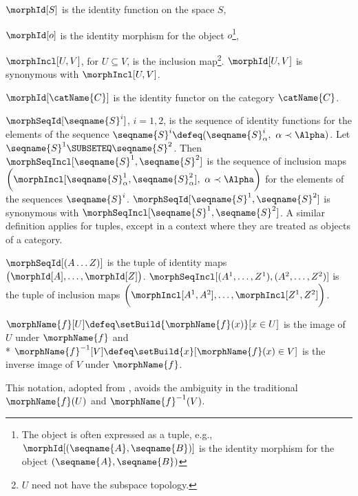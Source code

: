 \documentclass{article}
\begin{document}
\begin{definition}[Identity]
\label{def:Id}
$\morphId[S]$ is the identity function on the space $S$,

$\morphId[o]$ is the
identity morphism for the object $o$\footnote{
The object is often expressed as a tuple, e.g.,
$\morphId[{{(\seqname{A}, \seqname{B})}}]$ is the identity morphism for the
object $(\seqname{A}, \seqname{B})$
},

$\morphIncl[U,V]$, for $U \subseteq V$, is the inclusion map\footnote{
$U$ need not have the subspace topology.
}.
$\morphId[{{U,V}}]$ is synonymous with $\morphIncl[U,V]$.

$\morphId[\catName{C}]$ is the identity functor on the category $\catName{C}$.

$\morphSeqId[\seqname{S}^i]$, $i=1,2$, is the sequence of identity functions
for the elements of the sequence
$\seqname{S}^i \defeq (\seqname{S}^i_\alpha,~ \alpha \prec \Alpha)$. Let
$\seqname{S}^1 \SUBSETEQ \seqname{S}^2$. Then
$\morphSeqIncl[\seqname{S}^1,\seqname{S}^2]$ is the sequence of inclusion maps
$
  \biggl (
    \morphIncl[\seqname{S}^1_\alpha,\seqname{S}^2_\alpha],~ \alpha \prec \Alpha
  \biggr )
$
for the elements of the sequences $\seqname{S}^i$.
$\morphSeqId[{{\seqname{S}^1,\seqname{S}^2}}]$ is synonymous with
$\morphSeqIncl[\seqname{S}^1,\seqname{S}^2]$.  A similar definition applies for
tuples, except in a context where they are treated as objects of a
category.

$\morphSeqId[{{(A \dots Z)}}]$ is the tuple of identity maps
$\bigl (\morphId[A], \dots, \morphId[Z] \bigr)$.
$\morphSeqIncl[{(A^1, \dots, Z^1)},{(A^2, \dots, Z^2)}]$ is the tuple of inclusion maps
$\biggl ( \morphIncl[A^1, A^2], \dots, \morphIncl[Z^1, Z^2] \biggr )$.
\end{definition}

\begin{definition}[Images]
$\morphName{f} [U] \defeq \setBuild { {\morphName{f}(x)} }[x \in U]$ is the
image of $U$ under $\morphName{f}$ and \\*
$\morphName{f}^{-1} [V] \defeq \setBuild {x}[\morphName{f}(x) \in V]$ is the
inverse image of $V$ under $\morphName{f}$.

\begin{remark}
  This notation, adopted from \cite{GenTop}, avoids the ambiguity in
  the traditional $\morphName{f}(U)$ and $\morphName{f}^{-1}(V)$.
\end{remark}
\end{definition}
\end{document}
